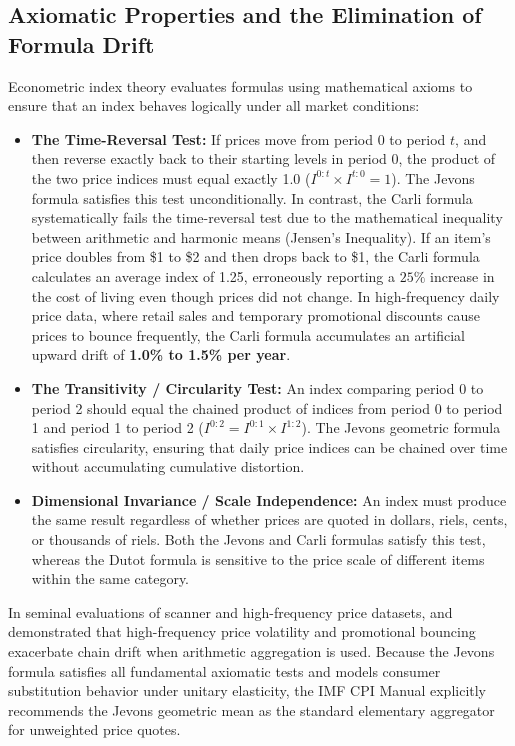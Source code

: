 \subsection{Axiomatic Properties and the Elimination of Formula Drift}
\hs Econometric index theory evaluates formulas using mathematical axioms to ensure that an index behaves logically under all market conditions:
\begin{itemize}
    \item \textbf{The Time-Reversal Test:} If prices move from period 0 to period $t$, and then reverse exactly back to their starting levels in period 0, the product of the two price indices must equal exactly 1.0 ($I^{0:t} \times I^{t:0} = 1$). The Jevons formula satisfies this test unconditionally. In contrast, the Carli formula systematically fails the time-reversal test due to the mathematical inequality between arithmetic and harmonic means (Jensen's Inequality). If an item's price doubles from \$1 to \$2 and then drops back to \$1, the Carli formula calculates an average index of 1.25, erroneously reporting a $25\%$ increase in the cost of living even though prices did not change. In high-frequency daily price data, where retail sales and temporary promotional discounts cause prices to bounce frequently, the Carli formula accumulates an artificial upward drift of \textbf{1.0\% to 1.5\% per year}.
    \item \textbf{The Transitivity / Circularity Test:} An index comparing period 0 to period 2 should equal the chained product of indices from period 0 to period 1 and period 1 to period 2 ($I^{0:2} = I^{0:1} \times I^{1:2}$). The Jevons geometric formula satisfies circularity, ensuring that daily price indices can be chained over time without accumulating cumulative distortion.
    \item \textbf{Dimensional Invariance / Scale Independence:} An index must produce the same result regardless of whether prices are quoted in dollars, riels, cents, or thousands of riels. Both the Jevons and Carli formulas satisfy this test, whereas the Dutot formula is sensitive to the price scale of different items within the same category.
\end{itemize}

\hs In seminal evaluations of scanner and high-frequency price datasets, \cite{diewert2020substitution} and \cite{chessa2016methodology} demonstrated that high-frequency price volatility and promotional bouncing exacerbate chain drift when arithmetic aggregation is used. Because the Jevons formula satisfies all fundamental axiomatic tests and models consumer substitution behavior under unitary elasticity, the IMF CPI Manual \citep{imf2020cpi} explicitly recommends the Jevons geometric mean as the standard elementary aggregator for unweighted price quotes.

